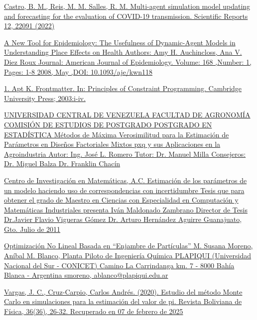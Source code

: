 \begin{itemize}
\begin{thebibliography}
    \bibitem[12]{}  \href{https://www.nature.com/articles/s41598-022-22945-z#citeas}{ Castro, B. M., Reis, M. M. Salles, R. M. Multi-agent simulation model updating and forecasting for the evaluation of COVID-19 transmission. Scientific Reports 12, 22091 (2022) }
     \label{sec:22}

     \bibitem[13]{}  \href{ https://doi.org/10.1093/aje/kwn118}{A New Tool for Epidemiology: The Usefulness of Dynamic-Agent Models in Understanding Place Effects on Health Authors: Amy H. Auchincloss, Ana V. Diez Roux Journal: American Journal of Epidemiology. Volume: 168 ,Number: 1, Pages: 1-8 2008,  May ,DOI: 10.1093/aje/kwn118}
    \label{sec:23}

    \bibitem[15]{}  \href{https://www.cambridge.org/core/books/principles-of-constraint-programming/C008FB32571F66C3EE0EEEBDE1F98A7D}{1. Apt K. Frontmatter. In: Principles of Constraint Programming. Cambridge University Press; 2003:i-iv.}
    \label{sec:25}

    \bibitem[16]{}  \href{http://saber.ucv.ve/bitstream/10872/14678/1/T026800014698-0-FinalDefensa_JoseLuisRomero-000.pdf}{UNIVERSIDAD CENTRAL DE VENEZUELA FACULTAD DE AGRONOMÍA COMISIÓN DE ESTUDIOS DE POSTGRADO POSTGRADO EN ESTADÍSTICA Métodos de Máxima Verosimilitud para la Estimación de Parámetros en Diseños
    Factoriales Mixtos pxq y sus Aplicaciones en la Agroindustria  Autor: Ing. José L. Romero Tutor: Dr. Manuel Milla Consejeros: Dr. Miguel Balza Dr. Franklin Chacín}
    \label{sec:26}

    \bibitem[17]{}\href{https://cimat.repositorioinstitucional.mx/jspui/bitstream/1008/255/2/TE%20388.pdf}{Centro de Investigación en Matemáticas, A.C. Estimación de los parámetros de un modelo haciendo uso de correspondencias con incertidumbre Tesis que para obtener el grado de Maestro en Ciencias con Especialidad en Computación y Matemáticas Industriales presenta Iván Maldonado Zambrano Director de Tesis Dr.Javier Flavio Vigueras Gómez Dr. Arturo Hernández Aguirre Guanajuato, Gto. Julio de 2011}
    \label{sec:27}

    \bibitem[18]  {}\href{https://cimat.repositorioinstitucional.mx/jspui/bitstream/1008/255/2/TE%20388.pdf}{Optimización No Lineal Basada en “Enjambre de Partículas” M. Susana Moreno, Aníbal M. Blanco, Planta Piloto de Ingeniería Química PLAPIQUI (Universidad Nacional del Sur - CONICET) Camino La Carrindanga km. 7 - 8000 Bahía Blanca - Argentina {smoreno, ablanco}@plapiqui.edu.ar}
    \label{sec:28}

    \bibitem[19]  {}\href{http://www.scielo.org.bo/scielo.php?script=sci_arttext&pid=S1562-38232020000100005&lng=es&tlng=es.}{Vargas, J. C., Cruz-Carpio, Carlos Andrés. (2020). Estudio del método Monte Carlo en simulaciones para la estimación del valor de pi. Revista Boliviana de Física, 36(36), 26-32. Recuperado en 07 de febrero de 2025}
    \label{sec:28}


\end{thebibliography}
\end{itemize}
